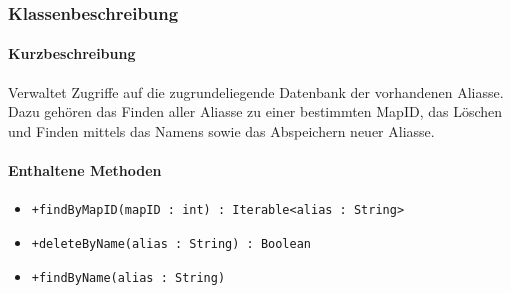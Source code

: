 \subsubsection*{Klassenbeschreibung}%
\paragraph*{Kurzbeschreibung}
Verwaltet Zugriffe auf die zugrundeliegende Datenbank der vorhandenen Aliasse.
Dazu gehören das Finden aller Aliasse zu einer bestimmten MapID, das Löschen und Finden mittels das Namens sowie
das Abspeichern neuer Aliasse.
\paragraph*{Enthaltene Methoden}
\begin{itemize}
    \item \texttt{+findByMapID(mapID : int) : Iterable<alias : String>}
    \item \texttt{+deleteByName(alias : String) : Boolean}
    \item \texttt{+findByName(alias : String)}
\end{itemize}
